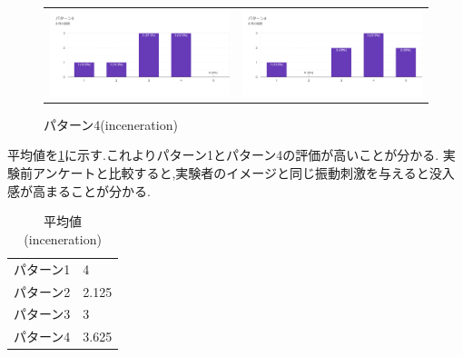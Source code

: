 \begin{figure}[h]
\begin{tabular}{cc}
      \begin{minipage}[t]{0.45\hsize}
        \centering
        \includegraphics[keepaspectratio, scale=0.5]{fig/inceneration3.png}
        \caption{パターン3(inceneration)}
        \label{fill}
      \end{minipage} &
      \begin{minipage}[t]{0.45\hsize}
        \centering
        \includegraphics[keepaspectratio, scale=0.5]{fig/inceneration4.png}
        \caption{パターン4(inceneration)}
        \label{transform}
      \end{minipage} 
    \end{tabular}
  \end{figure}

平均値を\ref{tab;inceAve}に示す.これよりパターン1とパターン4の評価が高いことが分かる.
実験前アンケートと比較すると,実験者のイメージと同じ振動刺激を与えると没入感が高まることが分かる.
\begin{table}[h]
    \caption{\label{tab;inceAve}平均値(inceneration)}
    \centering
    \begin{tabular}{l|l}
    \hline
    \hline
    パターン1 & 4\\
    パターン2 & 2.125\\
    パターン3 & 3\\
    パターン4 & 3.625\\
    \hline
    \end{tabular}
\end{table}


